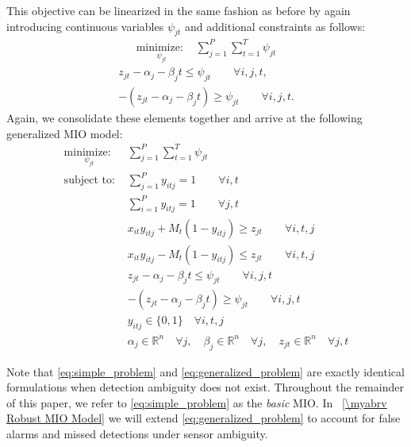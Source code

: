 This objective can be linearized in the same fashion as before by again introducing continuous variables $\psi_{jt}$ and additional constraints as follows:
\begin{align}\label{eq:generalized_linear_objective}
\underset{\psi_{jt}}{\text{minimize: }} & \sum_{j=1}^{P} \sum_{t=1}^{T} \psi_{jt}
\end{align}
\begin{align}
z_{jt} - \alpha_{j} - \beta_{j}t \leq \psi_{jt} \qquad \forall i,j,t,\\
-(z_{jt} - \alpha_{j} - \beta_{j}t) \geq \psi_{jt} \qquad \forall i,j,t.
\end{align}
Again, we consolidate these elements together and arrive at the following generalized MIO model:
\begin{align}
\underset{\psi_{jt}}{\text{minimize: }} & \sum_{j=1}^{P} \sum_{t=1}^{T} \psi_{jt} \label{eq:generalized_problem}\\
\text{subject to: }	& \sum_{j=1}^{P} y_{itj} = 1 \qquad \forall i,t\nonumber\\
				& \sum_{i=1}^{P} y_{itj} = 1 \qquad \forall j,t\nonumber\\
				& x_{it}y_{itj} + M_{t}(1-y_{itj}) \geq z_{jt} \qquad \forall i,t,j\nonumber\\
				& x_{it}y_{itj} - M_{t}(1-y_{itj}) \leq z_{jt} \qquad \forall i,t,j\nonumber\\
				& z_{jt} - \alpha_{j} - \beta_{j}t \leq \psi_{jt} \qquad \forall i,j,t\nonumber\\
				& -(z_{jt} - \alpha_{j} - \beta_{j}t) \geq \psi_{jt} \qquad \forall i,j,t\nonumber\\
			 	& y_{itj} \in \{0,1\} \quad \forall i,t,j\nonumber\\
				& \alpha_{j} \in \mathbb{R}^n \quad \forall j,\quad \beta_{j} \in \mathbb{R}^n \quad \forall j, \quad z_{jt} \in \mathbb{R}^n \quad \forall j,t\nonumber
\end{align}

Note that \eqref{eq:simple_problem} and \eqref{eq:generalized_problem} are exactly identical formulations when detection ambiguity does not exist. Throughout the remainder of this paper, we refer to \eqref{eq:simple_problem} as the \textit{basic} MIO. In \mysection~\ref{\myabrv Robust MIO Model} we will extend \eqref{eq:generalized_problem} to account for false alarms and missed detections under sensor ambiguity. 